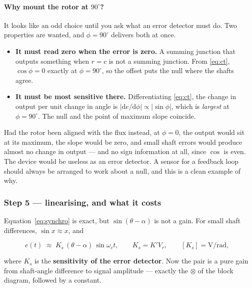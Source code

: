 \documentclass[11pt,a4paper]{article}
\begin{document}
\paragraph{Why mount the rotor at $90^\circ$?} It looks like an odd choice
until you ask what an error detector must do. Two properties are wanted, and
$\phi=90^\circ$ delivers both at once.

\begin{itemize}[leftmargin=1.5em,itemsep=2pt]
\item \textbf{It must read zero when the error is zero.} A summing junction
      that outputs something when $r=c$ is not a summing junction. From
      \eqref{eq:ct}, $\cos\phi=0$ exactly at $\phi=90^\circ$, so the offset
      puts the null where the shafts agree.
\item \textbf{It must be most sensitive there.} Differentiating
      \eqref{eq:ct}, the change in output per unit change in angle is
      $|\mathrm{d}e/\mathrm{d}\phi|\propto|\sin\phi|$, which is
      \emph{largest} at $\phi=90^\circ$. The null and the point of maximum
      slope coincide.
\end{itemize}

Had the rotor been aligned with the flux instead, at $\phi=0$, the output
would sit at its maximum, the slope would be zero, and small shaft errors
would produce almost no change in output --- and no sign information at all,
since $\cos$ is even. The device would be useless as an error detector. A
sensor for a feedback loop should always be arranged to work about a null,
and this is a clean example of why.

\subsubsection{Step 5 --- linearising, and what it costs}
\label{sss:linear}

Equation~\eqref{eq:synchro} is exact, but $\sin(\theta-\alpha)$ is not a gain.
For small shaft differences, $\sin x\approx x$, and

\begin{equation}
  e(t)\;\approx\;K_{s}\,(\theta-\alpha)\,\sin\omega_{c}t,
  \qquad K_{s}=K'V_{r},\qquad [K_{s}]=\si{\volt\per\radian},
  \label{eq:linear}
\end{equation}

where $K_{s}$ is the \textbf{sensitivity of the error detector}. Now the pair
is a pure gain from shaft-angle difference to signal amplitude --- exactly the
$\otimes$ of the block diagram, followed by a constant.
\end{document}
